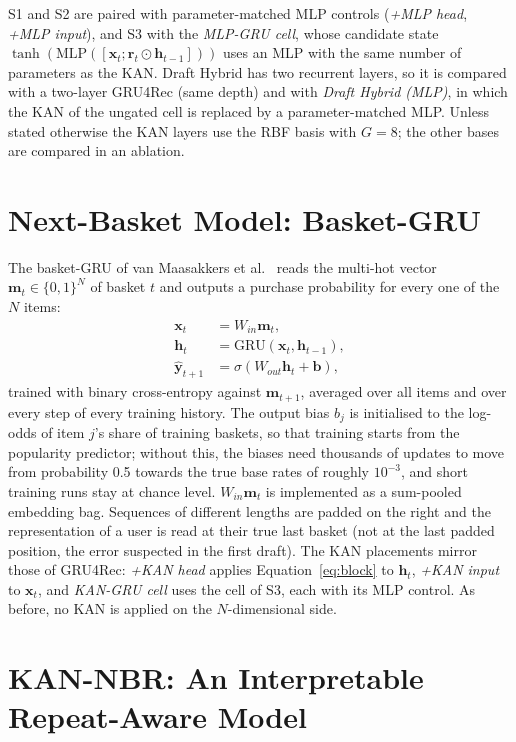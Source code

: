 S1 and S2 are paired with parameter-matched MLP controls (\emph{+MLP head},
\emph{+MLP input}), and S3 with the \emph{MLP-GRU cell}, whose candidate state
$\tanh(\mathrm{MLP}([\mathbf{x}_t; \mathbf{r}_t \odot \mathbf{h}_{t-1}]))$ uses an MLP with
the same number of parameters as the KAN. Draft Hybrid has two recurrent layers,
so it is compared with a two-layer GRU4Rec (same depth) and with \emph{Draft
Hybrid (MLP)}, in which the KAN of the ungated cell is replaced by a
parameter-matched MLP. Unless stated otherwise the KAN layers use the RBF basis
with $G=8$; the other bases are compared in an ablation.

\section{Next-Basket Model: Basket-GRU}

The basket-GRU of van Maasakkers et al.\ \cite{vanmaasakkers2023} reads the
multi-hot vector $\mathbf{m}_t \in \{0,1\}^N$ of basket $t$ and outputs a purchase
probability for every one of the $N$ items:
\begin{align}
\mathbf{x}_t &= W_{in}\mathbf{m}_t, \\
\mathbf{h}_t &= \mathrm{GRU}(\mathbf{x}_t, \mathbf{h}_{t-1}), \\
\hat{\mathbf{y}}_{t+1} &= \sigma(W_{out}\mathbf{h}_t + \mathbf{b}),
\end{align}
trained with binary cross-entropy against $\mathbf{m}_{t+1}$, averaged over all
items and over every step of every training history. The output bias $b_j$ is
initialised to the log-odds of item $j$'s share of training baskets, so that
training starts from the popularity predictor; without this, the biases need
thousands of updates to move from probability 0.5 towards the true base rates
of roughly $10^{-3}$, and short training runs stay at chance level. $W_{in}\mathbf{m}_t$ is
implemented as a sum-pooled embedding bag. Sequences of different lengths are
padded on the right and the representation of a user is read at their true last
basket (not at the last padded position, the error suspected in the first draft).
The KAN placements mirror those of GRU4Rec: \emph{+KAN head} applies
Equation~\eqref{eq:block} to $\mathbf{h}_t$, \emph{+KAN input} to $\mathbf{x}_t$,
and \emph{KAN-GRU cell} uses the cell of S3, each with its MLP control. As before, no KAN is applied on the
$N$-dimensional side.

\section{KAN-NBR: An Interpretable Repeat-Aware Model}
\label{sec:kannbr}

